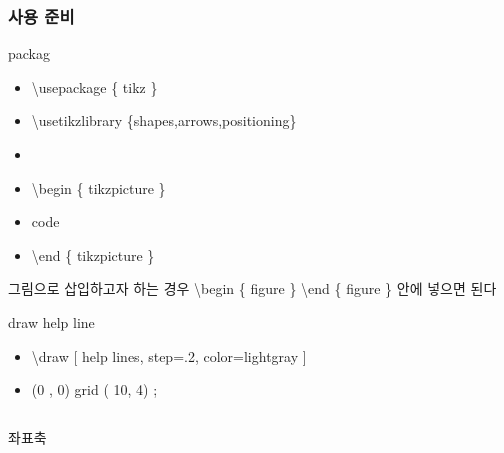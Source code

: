 \documentclass[ aspectratio=169,  12pt,blue,xcolor=pdftex,dvipsnames,table,handout,notes]{beamer}
\begin{document}
		\begin{frame}[c,allowframebreaks]
		\frametitle{사용 준비}

			\begin{block}{packag}
			\begin{itemize}
			\item[] 	\textbackslash usepackage \{ tikz \}
			\item[] 	\textbackslash usetikzlibrary \{shapes,arrows,positioning\}
			\item[] 	
			\item[] 	\textbackslash begin \{ tikzpicture \}
			\item[] 	\hskip 10mm code
			\item[] 	\textbackslash end \{ tikzpicture \}
			\end{itemize}
			\end{block}


			그림으로 삽입하고자 하는 경우 \textbackslash begin \{ figure \}  \textbackslash end \{ figure \} 안에 넣으면 된다

			\begin{block}{draw help line}
			\begin{itemize}
			\item[] 	\textbackslash draw [ help lines, step=.2, color=lightgray ]
			\item[] 	(0 , 0) grid ( 10, 4) ;
			\end{itemize}
			\end{block}


		\begin{columns}
		\begin{column}{0.4\textwidth}
			\begin{block}{좌표축}
			\end{block}
		\end{column}
		\end{columns}

		\end{frame}
\end{document}
